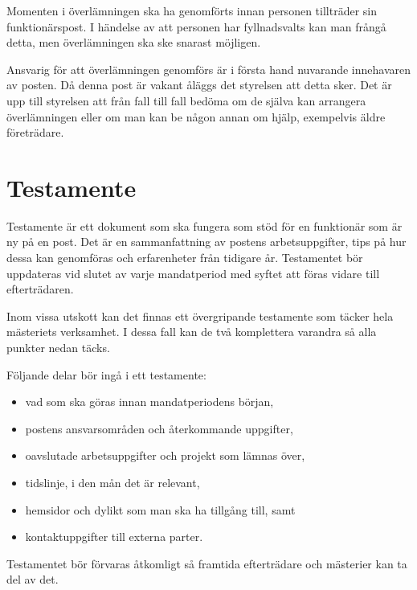 \documentclass{dsekguideline}
\begin{document}
Momenten i överlämningen ska ha genomförts innan personen tillträder sin
funktionärspost. I händelse av att personen har fyllnadsvalts kan man frångå
detta, men överlämningen ska ske snarast möjligen.

Ansvarig för att överlämningen genomförs är i första hand nuvarande innehavaren
av posten. Då denna post är vakant åläggs det styrelsen att detta sker. Det är
upp till styrelsen att från fall till fall bedöma om de själva kan arrangera
överlämningen eller om man kan be någon annan om hjälp, exempelvis äldre
företrädare.

\section{Testamente}

 Testamente är ett dokument som ska fungera som stöd för
en funktionär som är ny på en post. Det är en sammanfattning av postens
arbetsuppgifter, tips på hur dessa kan genomföras och erfarenheter från
tidigare år. Testamentet bör uppdateras vid slutet av varje mandatperiod med
syftet att föras vidare till efterträdaren.

Inom vissa utskott kan det finnas ett övergripande testamente som täcker hela
mästeriets verksamhet. I dessa fall kan de två komplettera varandra så alla
punkter nedan täcks.

Följande delar bör ingå i ett testamente:
\begin{itemize}
\item vad som ska göras innan mandatperiodens början,
\item postens ansvarsområden och återkommande uppgifter,
\item oavslutade arbetsuppgifter och projekt som lämnas över,
\item tidslinje, i den mån det är relevant,
\item hemsidor och dylikt som man ska ha tillgång till, samt
\item kontaktuppgifter till externa parter.
\end{itemize}

Testamentet bör förvaras åtkomligt så framtida efterträdare och mästerier kan ta
del av det.
\end{document}
